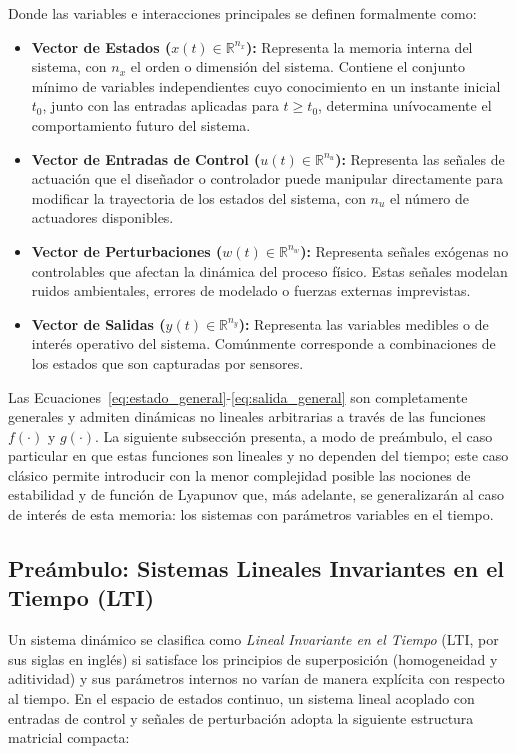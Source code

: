 Donde las variables e interacciones principales se definen formalmente como:
\begin{itemize}
    \item \textbf{Vector de Estados ($x(t) \in \mathbb{R}^{n_x}$):} Representa la memoria interna del sistema, con $n_x$ el orden o dimensión del sistema. Contiene el conjunto mínimo de variables independientes cuyo conocimiento en un instante inicial $t_0$, junto con las entradas aplicadas para $t \ge t_0$, determina unívocamente el comportamiento futuro del sistema.
    \item \textbf{Vector de Entradas de Control ($u(t) \in \mathbb{R}^{n_u}$):} Representa las señales de actuación que el diseñador o controlador puede manipular directamente para modificar la trayectoria de los estados del sistema, con $n_u$ el número de actuadores disponibles.
    \item \textbf{Vector de Perturbaciones ($w(t) \in \mathbb{R}^{n_w}$):} Representa señales exógenas no controlables que afectan la dinámica del proceso físico. Estas señales modelan ruidos ambientales, errores de modelado o fuerzas externas imprevistas.
    \item \textbf{Vector de Salidas ($y(t) \in \mathbb{R}^{n_y}$):} Representa las variables medibles o de interés operativo del sistema. Comúnmente corresponde a combinaciones de los estados que son capturadas por sensores.
\end{itemize}

Las Ecuaciones~\eqref{eq:estado_general}-\eqref{eq:salida_general} son completamente generales y admiten dinámicas no lineales arbitrarias a través de las funciones $f(\cdot)$ y $g(\cdot)$. La siguiente subsección presenta, a modo de preámbulo, el caso particular en que estas funciones son lineales y no dependen del tiempo; este caso clásico permite introducir con la menor complejidad posible las nociones de estabilidad y de función de Lyapunov que, más adelante, se generalizarán al caso de interés de esta memoria: los sistemas con parámetros variables en el tiempo.

\subsection{Preámbulo: Sistemas Lineales Invariantes en el Tiempo (LTI)}


Un sistema dinámico se clasifica como \textit{Lineal Invariante en el Tiempo} (LTI, por sus siglas en inglés) si satisface los principios de superposición (homogeneidad y aditividad) y sus parámetros internos no varían de manera explícita con respecto al tiempo. En el espacio de estados continuo, un sistema lineal acoplado con entradas de control y señales de perturbación adopta la siguiente estructura matricial compacta:

